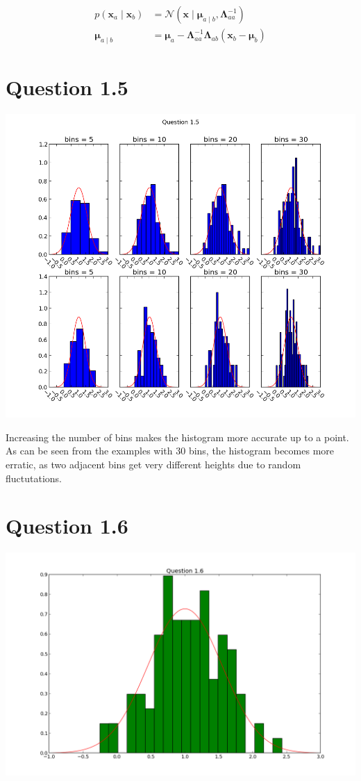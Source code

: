 \documentclass[11pt,a4paper]{article}
\newcommand{\mbf}[1]{\bm{#1}}
\begin{document}
\begin{align}
    p(\mbf{x}_a \mid \mbf{x}_b) &= \mathcal{N}(\mbf{x} \mid \mbf{\mu}_{a \mid b}, \mbf{\Lambda}_{aa}^{-1}) \\
    \mbf{\mu}_{a \mid b}   &= \mbf{\mu}_a - \mbf{\Lambda}_{aa}^{-1}\mbf{\Lambda}_{ab}(\mbf{x}_b - \mbf{\mu}_b) 
\end{align}

\section{Question 1.5}
\includegraphics[width=1.1\textwidth]{figure_3.png}

Increasing the number of bins makes the histogram more accurate up to a point. As can be
seen from the examples with 30 bins, the histogram becomes more erratic, as two adjacent
bins get very different heights due to random fluctutations.

\section{Question 1.6}
\includegraphics[width=1.1\textwidth]{figure_4.png}
\end{document}

